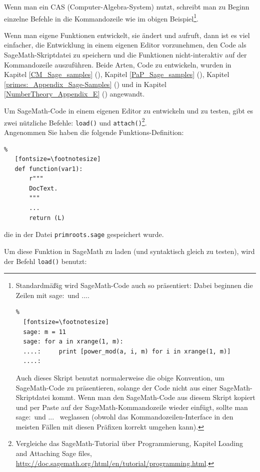 Wenn man ein CAS (Computer-Algebra-System) nutzt, schreibt man zu Beginn einzelne
Befehle in die Kommandozeile wie im obigen Beispiel\footnote{%
  Standardmäßig wird SageMath-Code auch so präsentiert: Dabei beginnen die Zeilen
  mit  \glqq sage:\grqq~und \glqq ...\grqq.
  \begin{Verbatim}%
  [fontsize=\footnotesize]
  sage: m = 11
  sage: for a in xrange(1, m):
  ....:     print [power_mod(a, i, m) for i in xrange(1, m)]
  ....:
  \end{Verbatim}

  Auch dieses Skript benutzt normalerweise die obige Konvention, um
  SageMath-Code zu präsentieren, solange der Code nicht aus einer SageMath-Skriptdatei kommt.
  Wenn man den SageMath-Code aus diesem Skript kopiert und per Paste auf der SageMath-Kommandozeile
  wieder einfügt, sollte man \glqq sage:\grqq~und \glqq ...\grqq~ weglassen
  (obwohl das Kommandozeilen-Interface in den meisten Fällen mit diesen Präfixen
  korrekt umgehen kann).}.

Wenn man eigene Funktionen entwickelt, sie ändert und aufruft, dann ist es viel einfacher,
die Entwicklung in einem eigenen Editor vorzunehmen, den Code als SageMath-Skriptdatei zu
speichern und die Funktionen nicht-interaktiv auf der Kommandozeile auszuführen.
Beide Arten, Code zu entwickeln, wurden in
Kapitel \ref{CM_Sage_samples} (\glqq {}\grqq),
Kapitel \ref{PaP_Sage_samples} (\glqq {}\grqq),
Kapitel \ref{primes:_Appendix_Sage-Samples} (\glqq {}\grqq)
und in Kapitel \ref{NumberTheory_Appendix_E} (\glqq{}\grqq)
angewandt.

Um SageMath-Code in einem eigenen Editor zu entwickeln und zu testen, gibt es zwei
nützliche Befehle: \verb!load()! und \verb!attach()!\footnote{%
Vergleiche das SageMath-Tutorial über Programmierung, Kapitel
\glqq Loading and Attaching Sage files\grqq,\\
\url{http://doc.sagemath.org/html/en/tutorial/programming.html}.}.\\
Angenommen Sie haben die folgende Funktions-Definition:
\begin{Verbatim}%
   [fontsize=\footnotesize]
   def function(var1):
       r"""
       DocText.
       """
       ...
       return (L)
\end{Verbatim}
die in der Datei \texttt{primroots.sage} gespeichert wurde.

Um diese Funktion in SageMath zu laden (und syntaktisch gleich zu testen),
wird der Befehl \verb!load()! benutzt:

